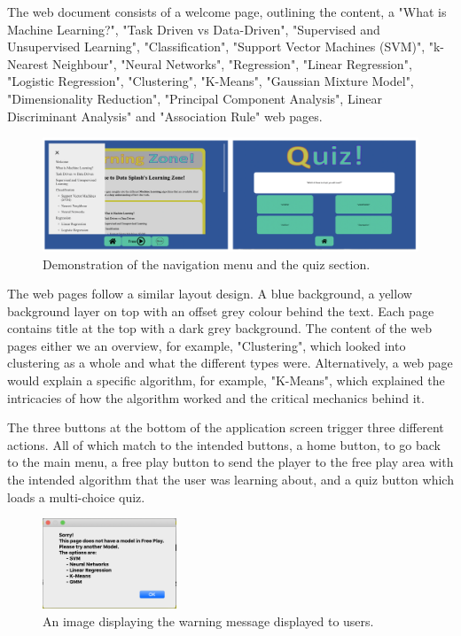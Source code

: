 		The web document consists of a welcome page, outlining the content, a "What is Machine Learning?", "Task Driven vs Data-Driven", "Supervised and Unsupervised Learning", "Classification", "Support Vector Machines (SVM)", "k-Nearest Neighbour", "Neural Networks", "Regression", "Linear Regression", "Logistic Regression", "Clustering", "K-Means", "Gaussian Mixture Model", "Dimensionality Reduction", "Principal Component Analysis", Linear Discriminant Analysis" and "Association Rule" web pages.
		
		\begin{figure}[t]
			\begin{center}
				\includegraphics[width=12cm]{graphics/lz_navi_quiz.png}
				\caption{Demonstration of the navigation menu and the quiz section.}
				\label{fig:lz_navi_quiz}
			\end{center}
		\end{figure}
	
		The web pages follow a similar layout design. A blue background, a yellow background layer on top with an offset grey colour behind the text. Each page contains title at the top with a dark grey background. The content of the web pages either we an overview, for example, "Clustering", which looked into clustering as a whole and what the different types were. Alternatively, a web page would explain a specific algorithm, for example, "K-Means", which explained the intricacies of how the algorithm worked and the critical mechanics behind it.
	
		The three buttons at the bottom of the application screen trigger three different actions. All of which match to the intended buttons, a home button, to go back to the main menu, a free play button to send the player to the free play area with the intended algorithm that the user was learning about, and a quiz button which loads a multi-choice quiz.
	
	\begin{figure}[b]
		\begin{center}
			\includegraphics[width=4cm]{graphics/no_model_warning.png}
			\caption{An image displaying the warning message displayed to users.}
			\label{fig:no_model_warning}
		\end{center}
	\end{figure}
	
